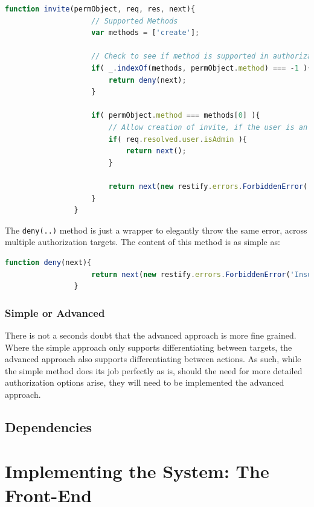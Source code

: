 			\begin{lstlisting}[gobble=16,language=JavaScript]
                function invite(permObject, req, res, next){
                    // Supported Methods
                    var methods = ['create'];
                    
                    // Check to see if method is supported in authorization suite
                    if( _.indexOf(methods, permObject.method) === -1 ){
                        return deny(next);
                    }
                    
                    if( permObject.method === methods[0] ){
                        // Allow creation of invite, if the user is an admin
                        if( req.resolved.user.isAdmin ){
                            return next();
                        }

                        return next(new restify.errors.ForbiddenError('Insufficient privileges'));
                    }
                }			
			\end{lstlisting}
			The \verb=deny(..)= method is just a wrapper to elegantly throw the same error, across multiple authorization targets. The content of this method is as simple as:
			\begin{lstlisting}[gobble=16,language=JavaScript]
                function deny(next){
                    return next(new restify.errors.ForbiddenError('Insufficient privileges'));
                }
			\end{lstlisting}

		\subsection{Simple or Advanced}
			There is not a seconds doubt that the advanced approach is more fine grained. Where the simple approach only supports differentiating between targets, the advanced approach also supports differentiating between actions. As such, while the simple method does its job perfectly as is, should the need for more detailed authorization options arise, they will need to be implemented the advanced approach.


	\section{Dependencies}


\chapter{Implementing the System: The Front-End}
